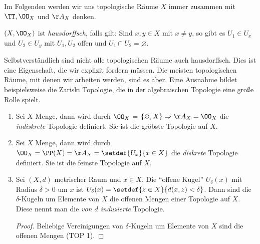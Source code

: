 Im Folgenden werden wir uns topologische Räume $X$ immer zusammen mit $\TT,
\OO_X$ und $\AA_X$ denken.

\begin{defnn}
$(X,\OO_X)$ ist \emph{hausdorffsch}, falls gilt: Sind $x,y\in X$ mit $x\neq y$,
so gibt es $U_1\in U_x$ und $U_2\in U_y$ mit $U_1,U_2$ offen und $U_1\cap U_2 =
\varnothing$.
\end{defnn}

Selbstverständlich sind nicht alle topologischen Räume auch hausdorffsch. Dies
ist eine Eigenschaft, die wir explizit fordern müssen. Die meisten
topologischen Räume, mit denen wir arbeiten werden, sind es aber. Eine Ausnahme
bildet beispielsweise die Zariski Topologie, die in der algebraischen Topologie
eine große Rolle spielt.

\begin{bsp}
\label{prop:1.1.6}
\begin{enumerate}[label=\arabic{*}.]
  \item Sei $X$ Menge, dann wird durch $\OO_X$ = $\{\varnothing, X\}
  \Rightarrow \AA_X = \OO_X$ die \emph{indiskrete} Topologie definiert. Sie ist
  die gröbste Topologie auf $X$.
  \item
  Sei $X$ Menge, dann wird durch $\OO_X = \PP(X) = \AA_X = \setdef{U_x}{x\in X}$
  die \emph{diskrete} Topologie definiert. Sie ist
  die feinste Topologie auf $X$. 
  \item Sei $(X,d)$ metrischer Raum und $x\in X$. Die ``offene Kugel''
  $U_\delta(x)$ mit Radius $\delta> 0$ um $x$ ist $U_\delta(x) = \setdef{z\in
  X}{d(x,z) < \delta}$. Dann sind die $\delta$-Kugeln um Elemente von $X$ die
  offenen Mengen einer Topologie auf $X$. Diese nennt man die \emph{von $d$
  induzierte} Topologie.
\begin{proof}
Beliebige Vereinigungen von $\delta$-Kugeln um Elemente von $X$ sind die
offenen Mengen (TOP 1).


\end{proof}
\end{enumerate}
\end{bsp}
